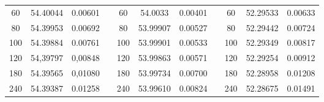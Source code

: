 \begin{table}[]
\begin{tabular}{ccccccccccc}
\multicolumn{1}{|c|}{60}          & \multicolumn{1}{c|}{54.40044} & \multicolumn{1}{c|}{0.00601}        & \multicolumn{1}{l|}{} & \multicolumn{1}{c|}{60}          & \multicolumn{1}{c|}{54.0033}  & \multicolumn{1}{c|}{0.00401}        & \multicolumn{1}{l|}{} & \multicolumn{1}{c|}{60}          & \multicolumn{1}{c|}{52.29533} & \multicolumn{1}{c|}{0.00633}        \\ \cline{1-3} \cline{5-7} \cline{9-11} 
\multicolumn{1}{|c|}{80}          & \multicolumn{1}{c|}{54.39953} & \multicolumn{1}{c|}{0.00692}        & \multicolumn{1}{l|}{} & \multicolumn{1}{c|}{80}          & \multicolumn{1}{c|}{53.99907} & \multicolumn{1}{c|}{0.00527}        & \multicolumn{1}{l|}{} & \multicolumn{1}{c|}{80}          & \multicolumn{1}{c|}{52.29442} & \multicolumn{1}{c|}{0.00724}        \\ \cline{1-3} \cline{5-7} \cline{9-11} 
\multicolumn{1}{|c|}{100}         & \multicolumn{1}{c|}{54.39884} & \multicolumn{1}{c|}{0.00761}        & \multicolumn{1}{c|}{} & \multicolumn{1}{c|}{100}         & \multicolumn{1}{c|}{53.99901} & \multicolumn{1}{c|}{0.00533}        & \multicolumn{1}{c|}{} & \multicolumn{1}{c|}{100}         & \multicolumn{1}{c|}{52.29349} & \multicolumn{1}{c|}{0.00817}        \\ \cline{1-3} \cline{5-7} \cline{9-11} 
\multicolumn{1}{|c|}{120}         & \multicolumn{1}{c|}{54,39797} & \multicolumn{1}{c|}{0,00848}        & \multicolumn{1}{c|}{} & \multicolumn{1}{c|}{120}         & \multicolumn{1}{c|}{53.99863} & \multicolumn{1}{c|}{0.00571}        & \multicolumn{1}{c|}{} & \multicolumn{1}{c|}{120}         & \multicolumn{1}{c|}{52.29254} & \multicolumn{1}{c|}{0.00912}        \\ \cline{1-3} \cline{5-7} \cline{9-11} 
\multicolumn{1}{|c|}{180}         & \multicolumn{1}{c|}{54.39565} & \multicolumn{1}{c|}{0,01080}        & \multicolumn{1}{c|}{} & \multicolumn{1}{c|}{180}         & \multicolumn{1}{c|}{53.99734} & \multicolumn{1}{c|}{0.00700}        & \multicolumn{1}{c|}{} & \multicolumn{1}{c|}{180}         & \multicolumn{1}{c|}{52.28958} & \multicolumn{1}{c|}{0.01208}        \\ \cline{1-3} \cline{5-7} \cline{9-11} 
\multicolumn{1}{|c|}{240}         & \multicolumn{1}{c|}{54.39387} & \multicolumn{1}{c|}{0.01258}        & \multicolumn{1}{c|}{} & \multicolumn{1}{c|}{240}         & \multicolumn{1}{c|}{53.99610} & \multicolumn{1}{c|}{0.00824}        & \multicolumn{1}{c|}{} & \multicolumn{1}{c|}{240}         & \multicolumn{1}{c|}{52.28675} & \multicolumn{1}{c|}{0.01491}        \\ \cline{1-3} \cline{5-7} \cline{9-11} 

\end{tabular}
\end{table}
